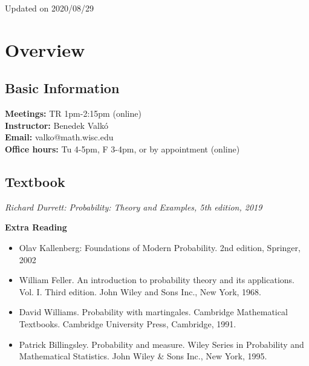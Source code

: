 \documentclass{article}
\begin{document}
    
    \tableofcontents
    \newpage

    \begin{center}
        \footnotesize Updated on 2020/08/29
    \end{center}

    \section{Overview}
        \subsection{Basic Information}
        {
        \textbf{Meetings:} TR 1pm-2:15pm (online)\\
        \textbf{Instructor:} Benedek Valkó\\
        \textbf{Email:} valko@math.wisc.edu\\
        \textbf{Office hours:} Tu 4-5pm, F 3-4pm, or by appointment (online)
        }

        \subsection{Textbook}
        \begin{center}
            \Large
            \textit{Richard Durrett: Probability: Theory and Examples, 5th edition, 2019}
        \end{center}
        \indent \textbf{Extra Reading}
        \begin{itemize}
            \item \large Olav Kallenberg: Foundations of Modern Probability. 2nd edition, Springer, 2002
            \item \large William Feller. An introduction to probability theory and its applications. Vol. I. Third edition. John Wiley and Sons Inc., New York, 1968.
            \item \large David Williams. Probability with martingales. Cambridge Mathematical Textbooks. Cambridge University Press, Cambridge, 1991.
            \item \large Patrick Billingsley. Probability and measure. Wiley Series in Probability and Mathematical Statistics. John Wiley \& Sons Inc., New York, 1995.
        \end{itemize}
\end{document}
